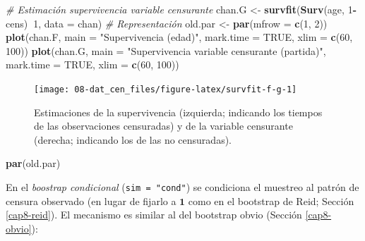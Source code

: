 \documentclass[]{book}
\newenvironment{Shaded}{\begin{snugshade}}{\end{snugshade}}
\newcommand{\KeywordTok}[1]{\textcolor[rgb]{0.13,0.29,0.53}{\textbf{#1}}}
\newcommand{\DataTypeTok}[1]{\textcolor[rgb]{0.13,0.29,0.53}{#1}}
\newcommand{\DecValTok}[1]{\textcolor[rgb]{0.00,0.00,0.81}{#1}}
\newcommand{\StringTok}[1]{\textcolor[rgb]{0.31,0.60,0.02}{#1}}
\newcommand{\CommentTok}[1]{\textcolor[rgb]{0.56,0.35,0.01}{\textit{#1}}}
\newcommand{\OtherTok}[1]{\textcolor[rgb]{0.56,0.35,0.01}{#1}}
\newcommand{\OperatorTok}[1]{\textcolor[rgb]{0.81,0.36,0.00}{\textbf{#1}}}
\newcommand{\NormalTok}[1]{#1}
\theoremstyle{definition}
\theoremstyle{definition}
\theoremstyle{definition}
\theoremstyle{remark}
\begin{document}
\begin{Shaded}
\begin{Highlighting}[]
\CommentTok{# Estimación supervivencia variable censurante}
\NormalTok{chan.G <-}\StringTok{ }\KeywordTok{survfit}\NormalTok{(}\KeywordTok{Surv}\NormalTok{(age, }\DecValTok{1}\OperatorTok{-}\NormalTok{cens)}\OperatorTok{~}\DecValTok{1}\NormalTok{, }\DataTypeTok{data =}\NormalTok{ chan)}
\CommentTok{# Representación}
\NormalTok{old.par <-}\StringTok{ }\KeywordTok{par}\NormalTok{(}\DataTypeTok{mfrow =} \KeywordTok{c}\NormalTok{(}\DecValTok{1}\NormalTok{, }\DecValTok{2}\NormalTok{))}
\KeywordTok{plot}\NormalTok{(chan.F, }\DataTypeTok{main =} \StringTok{"Supervivencia (edad)"}\NormalTok{, }\DataTypeTok{mark.time =} \OtherTok{TRUE}\NormalTok{, }
    \DataTypeTok{xlim =} \KeywordTok{c}\NormalTok{(}\DecValTok{60}\NormalTok{, }\DecValTok{100}\NormalTok{))}
\KeywordTok{plot}\NormalTok{(chan.G, }\DataTypeTok{main =} \StringTok{"Supervivencia variable censurante (partida)"}\NormalTok{, }
     \DataTypeTok{mark.time =} \OtherTok{TRUE}\NormalTok{, }\DataTypeTok{xlim =} \KeywordTok{c}\NormalTok{(}\DecValTok{60}\NormalTok{, }\DecValTok{100}\NormalTok{))}
\end{Highlighting}
\end{Shaded}

\begin{figure}[!htb]

{\centering \texttt{[image: 08-dat\_cen\_files/figure-latex/survfit-f-g-1]} 

}

\caption{Estimaciones de la supervivencia (izquierda; indicando los tiempos de las observaciones censuradas) y de la variable censurante (derecha; indicando los de las no censuradas).}\label{fig:survfit-f-g}
\end{figure}

\begin{Shaded}
\begin{Highlighting}[]
\KeywordTok{par}\NormalTok{(old.par)}
\end{Highlighting}
\end{Shaded}

En el \emph{boostrap condicional} (\texttt{sim\ =\ "cond"}) se
condiciona el muestreo al patrón de censura observado (en lugar de
fijarlo a \(\mathbf{1}\) como en el bootstrap de Reid; Sección
\ref{cap8-reid}). El mecanismo es similar al del bootstrap obvio
(Sección \ref{cap8-obvio}):
\end{document}
